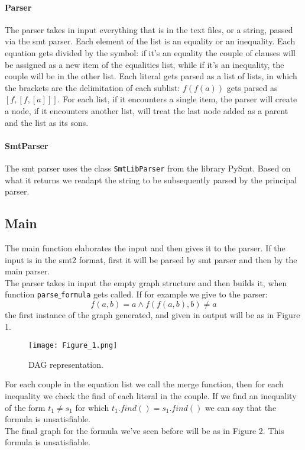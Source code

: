 \documentclass[11pt]{article}
\begin{document}
\paragraph{Parser}
    The parser takes in input everything that is in the text files, or a string, passed via the smt parser. Each element of the list is an equality or an inequality. Each equation gets divided by the symbol: if it's an equality the couple of clauses will be assigned as a new item of the equalities list, while if it's an inequality, the couple will be in the other list. Each literal gets parsed as a list of lists, in which the brackets are the delimitation of each sublist: $f(f(a))$ gets parsed as $[f, [f, [a]]]$. For each list, if it encounters a single item, the parser will create a node, if it encounters another list, will treat the last node added as a parent and the list as its sons.
\paragraph{SmtParser}
    The smt parser uses the class \texttt{SmtLibParser} from the library PySmt. Based on what it returns we readapt the string to be subsequently parsed by the principal parser.
\subsection{Main}
The main function elaborates the input and then gives it to the parser. If the input is in the smt2 format, first it will be parsed by smt parser and then by the main parser.\\
The parser takes in input the empty graph structure and then builds it, when function \texttt{parse$\_$formula} gets called. 
If for example we give to the parser:
$$f(a,b) = a \land f(f(a,b),b) \neq a$$
the first instance of the graph generated, and given in output will be as in Figure 1.

\begin{figure}[!htbp]
    \centering
    \texttt{[image: Figure\_1.png]}
    \caption{DAG representation.}
    \label{fig:enter-label}
\end{figure}

For each couple in the equation list we call the merge function, then for each inequality we check the find of each literal in the couple. If we find an inequality of the form $t_1 \neq s_1$ for which $t_1.find() = s_1.find()$ we can say that the formula is unsatisfiable.\\ The final graph for the formula we've seen before will be as in Figure 2. This formula is unsatisfiable.
\end{document}
